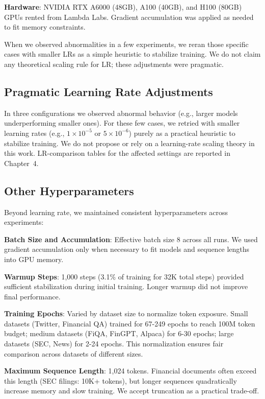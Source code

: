 \textbf{Hardware}: NVIDIA RTX A6000 (48GB), A100 (40GB), and H100 (80GB) GPUs rented from Lambda Labs. Gradient accumulation was applied as needed to fit memory constraints.

When we observed abnormalities in a few experiments, we reran those specific cases with smaller LRs as a simple heuristic to stabilize training. We do not claim any theoretical scaling rule for LR; these adjustments were pragmatic.

\subsection{Pragmatic Learning Rate Adjustments}

In three configurations we observed abnormal behavior (e.g., larger models underperforming smaller ones). For these few cases, we retried with smaller learning rates (e.g., $1\times 10^{-5}$ or $5\times 10^{-6}$) purely as a practical heuristic to stabilize training. We do not propose or rely on a learning-rate scaling theory in this work. LR-comparison tables for the affected settings are reported in Chapter~4.

\subsection{Other Hyperparameters}

Beyond learning rate, we maintained consistent hyperparameters across experiments:

\textbf{Batch Size and Accumulation}: Effective batch size 8 across all runs. We used gradient accumulation only when necessary to fit models and sequence lengths into GPU memory.

\textbf{Warmup Steps}: 1,000 steps (3.1\% of training for 32K total steps) provided sufficient stabilization during initial training. Longer warmup did not improve final performance.

\textbf{Training Epochs}: Varied by dataset size to normalize token exposure. Small datasets (Twitter, Financial QA) trained for 67-249 epochs to reach 100M token budget; medium datasets (FiQA, FinGPT, Alpaca) for 6-30 epochs; large datasets (SEC, News) for 2-24 epochs. This normalization ensures fair comparison across datasets of different sizes.

\textbf{Maximum Sequence Length}: 1,024 tokens. Financial documents often exceed this length (SEC filings: 10K+ tokens), but longer sequences quadratically increase memory and slow training. We accept truncation as a practical trade-off.

